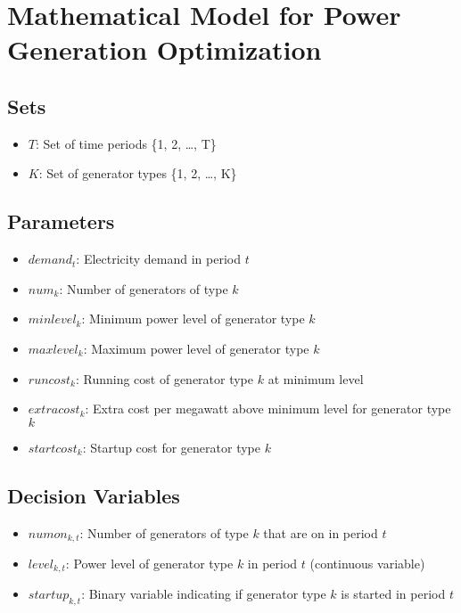 \documentclass{article}
\begin{document}
\section*{Mathematical Model for Power Generation Optimization}

\subsection*{Sets}
\begin{itemize}
    \item \( T \): Set of time periods \{1, 2, \ldots, T\}
    \item \( K \): Set of generator types \{1, 2, \ldots, K\}
\end{itemize}

\subsection*{Parameters}
\begin{itemize}
    \item \( demand_{t} \): Electricity demand in period \( t \)
    \item \( num_{k} \): Number of generators of type \( k \)
    \item \( minlevel_{k} \): Minimum power level of generator type \( k \)
    \item \( maxlevel_{k} \): Maximum power level of generator type \( k \)
    \item \( runcost_{k} \): Running cost of generator type \( k \) at minimum level
    \item \( extracost_{k} \): Extra cost per megawatt above minimum level for generator type \( k \)
    \item \( startcost_{k} \): Startup cost for generator type \( k \)
\end{itemize}

\subsection*{Decision Variables}
\begin{itemize}
    \item \( numon_{k, t} \): Number of generators of type \( k \) that are on in period \( t \)
    \item \( level_{k, t} \): Power level of generator type \( k \) in period \( t \) (continuous variable)
    \item \( startup_{k, t} \): Binary variable indicating if generator type \( k \) is started in period \( t \)
\end{itemize}
\end{document}
